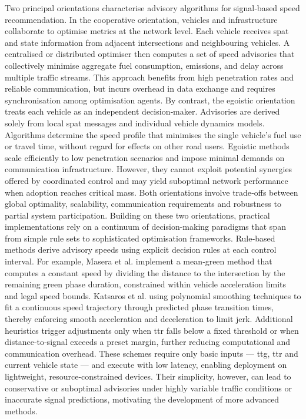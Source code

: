 Two principal orientations characterise advisory algorithms for signal‐based speed recommendation. In the cooperative orientation, vehicles and infrastructure collaborate to optimise metrics at the network level. Each vehicle receives \ac{spat} and state information from adjacent intersections and neighbouring vehicles. A centralised or distributed optimiser then computes a set of speed advisories that collectively minimise aggregate fuel consumption, emissions, and delay across multiple traffic streams. This approach benefits from high penetration rates and reliable communication, but incurs overhead in data exchange and requires synchronisation among optimisation agents.
By contrast, the egoistic orientation treats each vehicle as an independent decision‐maker. Advisories are derived solely from local \ac{spat} messages and individual vehicle dynamics models. Algorithms determine the speed profile that minimises the single vehicle’s fuel use or travel time, without regard for effects on other road users. Egoistic methods scale efficiently to low penetration scenarios and impose minimal demands on communication infrastructure. However, they cannot exploit potential synergies offered by coordinated control and may yield suboptimal network performance when adoption reaches critical mass.
Both orientations involve trade‐offs between global optimality, scalability, communication requirements and robustness to partial system participation.  
\mynewline
Building on these two orientations, practical implementations rely on a continuum of decision-making paradigms that span from simple rule sets to sophisticated optimisation frameworks. Rule‐based methods derive advisory speeds using explicit decision rules at each control interval. For example, Masera et al. \cite{Masera2019} implement a mean‐green method that computes a constant speed by dividing the distance to the intersection by the remaining green phase duration, constrained within vehicle acceleration limits and legal speed bounds. Katsaros et al. \cite{Katsaros2011} using polynomial smoothing techniques to fit a continuous speed trajectory through predicted phase transition times, thereby enforcing smooth acceleration and deceleration to limit jerk. Additional heuristics trigger adjustments only when \ac{ttr} falls below a fixed threshold or when distance‐to‐signal exceeds a preset margin, further reducing computational and communication overhead. These schemes require only basic inputs --- \ac{ttg}, \ac{ttr} and current vehicle state --- and execute with low latency, enabling deployment on lightweight, resource‐constrained devices. Their simplicity, however, can lead to conservative or suboptimal advisories under highly variable traffic conditions or inaccurate signal predictions, motivating the development of more advanced methods.
